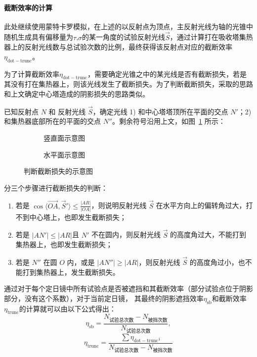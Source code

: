 \documentclass[../main.tex]{subfiles}
\begin{document}
\paragraph{截断效率的计算} 此处继续使用蒙特卡罗模拟，在上述的以反射点为顶点，主反射光线为轴的光锥中随机生成具有偏移量为\(\tau\),\(\sigma\)的某一角度的试验反射光线\(\vec S\)，通过计算打在吸收塔集热器上的反射光线数与总试验次数的比例，最终获得该反射点对应的截断效率\(\eta _{\mathrm{dot}{-}\mathrm{trunc}}\)。

为了计算截断效率\(\eta _{\mathrm{dot-trunc}}\)，需要确定光锥之中的某光线是否有截断损失，若是其没有打在集热器上，则该光线发生了截断损失。为了判断截断损失，采取的思路和上文确定中心塔造成的阴影损失的思路类似。

已知反射点 \(N\) 和 反射光线 \(\vec S\)，确定光线 1) 和中心塔塔顶所在平面的交点 \(N'\)；2) 和集热器底部所在的平面的交点 \(N''\)。剩余符号沿用上文，如图~\ref{fig:trunc} 所示：
%
\begin{figure}[H]
\centering
\begin{subfigure}[b]{0.4\textwidth}
\centering

\caption{\kaishu 竖直面示意图}
\end{subfigure}
\begin{subfigure}[b]{0.4\textwidth}
\centering

\caption{\kaishu 水平面示意图}
\end{subfigure}
\caption{\kaishu 判断截断损失的示意图}
\label{fig:trunc}
\end{figure}
%
分三个步骤进行截断损失的判断：
\begin{enumerate}
\item 若是 \( \displaystyle\cos \langle \overrightarrow{OA}, \vec S' \rangle\le \frac{\vert AR \vert}{\vert OA \vert}\)，则说明反射光线 \(\vec S\) 在水平方向上的偏转角过大，打不到中心塔上，也即发生截断损失；
\item 若是 \(\vert AN'\vert \le \vert AR \vert\)且 \(N'\) 不在圆内，则反射光线 \(\vec S\) 的高度角过大，不能打到集热器上，也即发生截断损失；
\item 若是 \(N''\) 在圆 \(O\) 内，或是 \(\vert AN'' \vert \ge \vert AR \vert\)，则反射光线 \(\vec S\) 的高度角过小，也不能打到集热器上，发生截断损失。
\end{enumerate}
通过对于每个定日镜中所有试验点是否被遮挡和其截断效率（部分试验点位于阴影部分，没有这个系数），对于当前定日镜，
其最终的阴影遮挡效率\(\eta _{\mathrm{s b}}\)和截断效率 \(\eta _{\mathrm{trunc}}\)的计算就可以由以下公式得出：
\begin{equation}
\eta _{\mathrm{s b}} = \frac{N_{\text{试验总次数}}- N_{\text{被挡次数}}}{N_{\text{试验总次数}}},
\end{equation}
\begin{equation}
\eta _{\mathrm{trunc}} =\frac{\sum\eta _{\mathrm{dot}{-}\mathrm{trunc}}{}_i}{N_{\text{试验总次数}}- N_{\text{被挡次数}}}
\end{equation}
\end{document}
